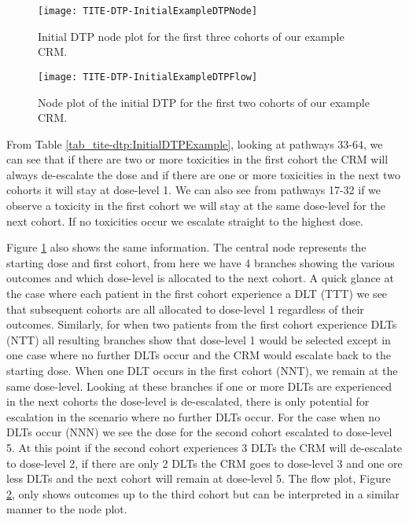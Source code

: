 \begin{figure}[h!]
	\centering
	\caption[Initial DTP node plot.]{Initial DTP node plot for the first three cohorts of our example CRM.}
	\label{fig_tite-dtp:InitialDTPExampleNode}
	\texttt{[image: TITE-DTP-InitialExampleDTPNode]}
\end{figure}

\begin{figure}[h!]
	\centering
	\caption[Initial DTP flow plot.]{Node plot of the initial DTP for the first two cohorts of our example CRM.}
	\label{fig_tite-dtp:InitialDTPExampleFlow}
	\texttt{[image: TITE-DTP-InitialExampleDTPFlow]}
\end{figure}

From Table \ref{tab_tite-dtp:InitialDTPExample}, looking at pathways 33-64, we can see that if there are two or more toxicities in the first cohort the CRM will always de-escalate the dose and if there are one or more toxicities in the next two cohorts it will stay at dose-level 1. We can also see from pathways 17-32 if we observe a toxicity in the first cohort we will stay at the same dose-level for the next cohort. If no toxicities occur we escalate straight to the highest dose. 

Figure \ref{fig_tite-dtp:InitialDTPExampleNode} also shows the same information. The central node represents the starting dose and first cohort, from here we have 4 branches showing the various outcomes and which dose-level is allocated to the next cohort. A quick glance at the case where each patient in the first cohort experience a DLT (TTT) we see that subsequent cohorts are all allocated to dose-level 1 regardless of their outcomes. Similarly, for when two patients from the first cohort experience DLTs (NTT) all resulting branches show that dose-level 1 would be selected except in one case where no further DLTs occur and the CRM would escalate back to the starting dose. When one DLT occurs in the first cohort (NNT), we remain at the same dose-level. Looking at these branches if one or more DLTs are experienced in the next cohorts the dose-level is de-escalated, there is only potential for escalation in the scenario where no further DLTs occur. For the case when no DLTs occur (NNN) we see the dose for the second cohort escalated to dose-level 5. At this point if the second cohort experiences 3 DLTs the CRM will de-escalate to dose-level 2, if there are only 2 DLTs the CRM goes to dose-level 3 and one ore less DLTs and the next cohort will remain at dose-level 5. The flow plot, Figure \ref{fig_tite-dtp:InitialDTPExampleFlow}, only shows outcomes up to the third cohort but can be interpreted in a similar manner to the node plot.

